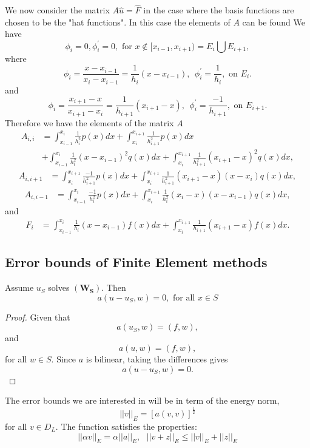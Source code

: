 We now consider the matrix $A\hat{u}=\hat{F}$ in the case where the basis functions
are chosen to be the "hat functions". In this case the elements of $A$ can be found
We have
\[\phi_i=0, \phi_i^{'}=0, \mbox{ for }  x\notin [x_{i-1},x_{i+1}) = E_{i}\bigcup E_{i+1},\]
where
\[\phi_i=\frac{x-x_{i-1}}{x_i-x_{i-1}}=\frac{1}{h_i}(x-x_{i-1}), \ \  \phi_i^{'}=\frac{1}{h_{i}}, \mbox{ on }  E_{i}.\]
and
\[\phi_i=\frac{x_{i+1}-x}{x_{i+1}-x_{i}}=\frac{1}{h_{i+1}}(x_{i+1}-x), \ \ \phi_i^{'}=\frac{-1}{h_{i+1}}, \mbox{ on }  E_{i+1}.\]
Therefore we have the elements of the matrix $A$
\[\begin{array}{ll}
A_{i,i}&=\int_{x_{i-1}}^{x_{i}}\frac{1}{h_i^2}p(x)dx +\int_{x_{i}}^{x_{i+1}}\frac{1}{h_{i+1}^2}p(x)dx \\
&+\int_{x_{i-1}}^{x_{i}}\frac{1}{h_i^2}(x-x_{i-1})^2q(x)dx +\int_{x_{i}}^{x_{i+1}}\frac{1}{h_{i+1}^2}(x_{i+1}-x)^2q(x)dx ,
\end{array}
 \]
\[\begin{array}{ll}
A_{i,i+1}&=\int_{x_{i}}^{x_{i+1}}\frac{-1}{h_{i+1}^2}p(x)dx 
+\int_{x_{i}}^{x_{i+1}}\frac{1}{h_{i+1}^2}(x_{i+1}-x)(x-x_i)q(x)dx, 
\end{array}
 \]
\[\begin{array}{ll}
A_{i,i-1}&=\int_{x_{i-1}}^{x_{i}}\frac{-1}{h_{i}^2}p(x)dx 
+\int_{x_{i}}^{x_{i+1}}\frac{1}{h_{i}^2}(x_{i}-x)(x-x_{i-1})q(x)dx, 
\end{array}
 \]
and
\[\begin{array}{ll}
F_{i}&=\int_{x_{i-1}}^{x_{i}}\frac{1}{h_{i}}(x-x_{i-1})f(x)dx 
+\int_{x_{i}}^{x_{i+1}}\frac{1}{h_{i+1}}(x_{i+1}-x)f(x)dx. 
\end{array}
 \]
\subsection{Error bounds of Finite Element methods}
\begin{lemma}
Assume $u_S$ solves $\mathbf{(W_S)}$. Then
\[a(u-u_S,w)=0, \mbox{  for all } x \in S \]
\end{lemma}

\begin{proof}
Given that
\[a(u_S,w)=(f,w), \]
and
\[a(u,w)=(f,w), \]
for all $w \in S$. Since $a$ is bilinear, taking the differences gives
\[a(u-u_S,w)=0. \]
\end{proof}

The error bounds we are interested in will be in term of the energy norm,
\[||v||_E=[a(v,v)]^{\frac{1}{2}} \]
for all $v\in D_L$.  The function satisfies the properties:
\[||\alpha v||_E=\alpha ||a||_E, \ \ \ ||v+z||_{E}\leq ||v||_E+||z||_E \]

